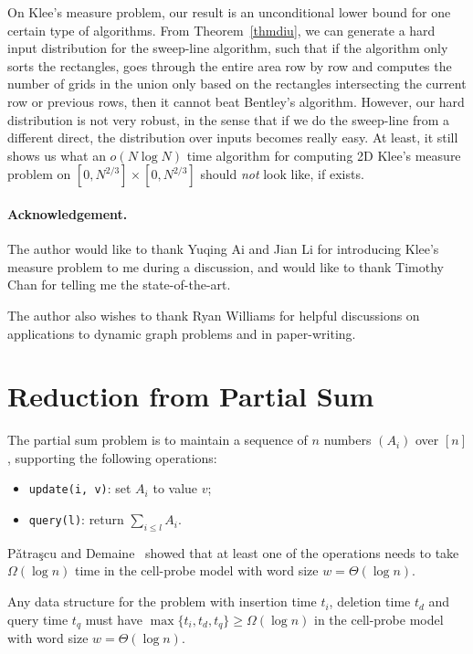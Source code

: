 \documentclass[11pt]{article}
\begin{document}
On Klee's measure problem, our result is an unconditional lower bound for one certain type of algorithms. From Theorem~\ref{thmdiu}, we can generate a hard input distribution for the sweep-line algorithm, such that if the algorithm only sorts the rectangles, goes through the entire area row by row and computes the number of grids in the union only based on the rectangles intersecting the current row or previous rows, then it cannot beat Bentley's algorithm. However, our hard distribution is not very robust, in the sense that if we do the sweep-line from a different direct, the distribution over inputs becomes really easy. At least, it still shows us what an $o(N\log N)$ time algorithm for computing 2D Klee's measure problem on $[0,N^{2/3}]\times [0,N^{2/3}]$ should \emph{not} look like, if exists. 

\paragraph*{Acknowledgement.}
The author would like to thank Yuqing Ai and Jian Li for introducing Klee's measure problem to me during a discussion, and would like to thank Timothy Chan for telling me the state-of-the-art.

 The author also wishes to thank Ryan Williams for helpful discussions on applications to dynamic graph problems and in paper-writing. 





\appendix

\section{Reduction from Partial Sum}\label{sectredps}
The partial sum problem is to maintain a sequence of $n$ numbers $(A_i)$ over $[n]$, supporting the following operations:
\begin{itemize}
	\item
		\verb+update(i, v)+: set $A_i$ to value $v$;
	\item
		\verb+query(l)+: return $\sum_{i\leq l}A_i$.
\end{itemize}

P\v{a}tra\c{s}cu and Demaine~\cite{PD04a} showed that at least one of the operations needs to take $\Omega(\log n)$ time in the cell-probe model with word size $w=\Theta(\log n)$. 

\begin{proposition}\label{redps}
Any data structure for the \diu{} problem with insertion time $t_i$, deletion time $t_d$ and query time $t_q$ must have $\max\{t_i,t_d,t_q\}\geq \Omega(\log n)$ in the cell-probe model with word size $w=\Theta(\log n)$. 
\end{proposition}
\end{document}
